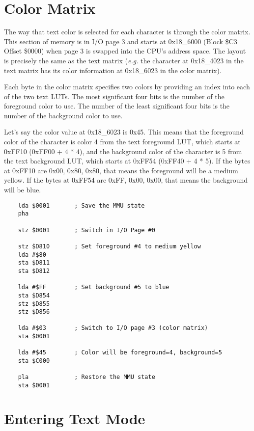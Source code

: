 \section*{Color Matrix}

The way that text color is selected for each character is through the color matrix. This section of memory is in I/O page 3 and starts at 0x18\_6000 (Block \$C3 Offset \$0000) when page 3 is swapped into the CPU's address space. The layout is precisely the same as the text matrix ({\it e.g.} the character at 0x18\_4023 in the text matrix has its color information at 0x18\_6023 in the color matrix).

Each byte in the color matrix specifies two colors by providing an index into each of the two text LUTs. The most significant four bits is the number of the foreground color to use. The number of the least significant four bits is the number of the background color to use.

Let's say the color value at 0x18\_6023 is 0x45. This means that the foreground color of the character is color 4 from the text foreground LUT, which starts at 0xFF10 (0xFF00 + 4 * 4), and the background color of the character is 5 from the text background LUT, which starts at 0xFF54 (0xFF40 + 4 * 5). If the bytes at 0xFF10 are 0x00, 0x80, 0x80, that means the foreground will be a medium yellow. If the bytes at 0xFF54 are 0xFF, 0x00, 0x00, that means the background will be blue.

\begin{verbatim}
    lda $0001       ; Save the MMU state
    pha

    stz $0001       ; Switch in I/O Page #0

    stz $D810       ; Set foreground #4 to medium yellow
    lda #$80
    sta $D811
    sta $D812

    lda #$FF        ; Set background #5 to blue
    sta $D854
    stz $D855
    stz $D856

    lda #$03        ; Switch to I/O page #3 (color matrix)
    sta $0001

    lda #$45        ; Color will be foreground=4, background=5
    sta $C000

    pla             ; Restore the MMU state
    sta $0001
\end{verbatim}

\section*{Entering Text Mode}

